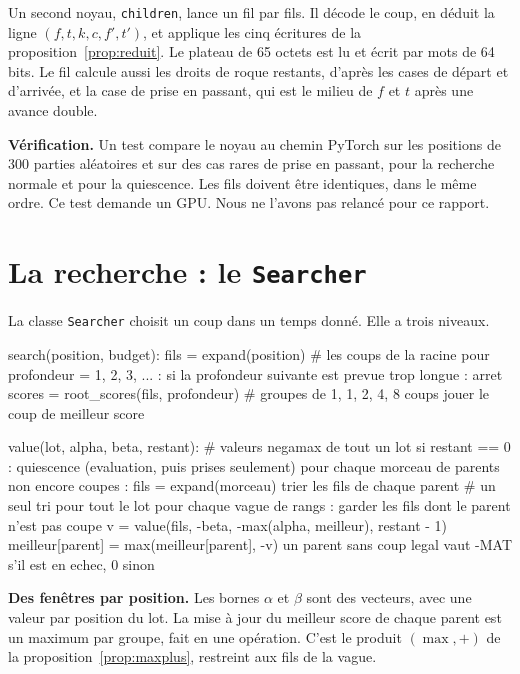 \documentclass[11pt,a4paper]{article}
\newcommand{\code}[1]{\texttt{#1}}
\newcounter{calcul}
\theoremstyle{plain}
\begin{document}
Un second noyau, \code{children}, lance un fil par fils. Il décode le coup, en déduit la ligne
$(f, t, k, c, f', t')$, et applique les cinq écritures de la proposition~\ref{prop:reduit}. Le
plateau de 65 octets est lu et écrit par mots de 64 bits. Le fil calcule aussi les droits de
roque restants, d'après les cases de départ et d'arrivée, et la case de prise en passant, qui est
le milieu de $f$ et $t$ après une avance double.

\textbf{Vérification.} Un test compare le noyau au chemin PyTorch sur les positions de 300
parties aléatoires et sur des cas rares de prise en passant, pour la recherche normale et pour la
quiescence. Les fils doivent être identiques, dans le même ordre. Ce test demande un GPU. Nous ne
l'avons pas relancé pour ce rapport.

\section{La recherche : le \code{Searcher}}

La classe \code{Searcher} choisit un coup dans un temps donné. Elle a trois niveaux.

\begin{python}
search(position, budget):
    fils = expand(position)                    # les coups de la racine
    pour profondeur = 1, 2, 3, ... :
        si la profondeur suivante est prevue trop longue : arret
        scores = root_scores(fils, profondeur) # groupes de 1, 1, 2, 4, 8 coups
    jouer le coup de meilleur score

value(lot, alpha, beta, restant):              # valeurs negamax de tout un lot
    si restant == 0 : quiescence (evaluation, puis prises seulement)
    pour chaque morceau de parents non encore coupes :
        fils = expand(morceau)
        trier les fils de chaque parent        # un seul tri pour tout le lot
        pour chaque vague de rangs :
            garder les fils dont le parent n'est pas coupe
            v = value(fils, -beta, -max(alpha, meilleur), restant - 1)
            meilleur[parent] = max(meilleur[parent], -v)
    un parent sans coup legal vaut -MAT s'il est en echec, 0 sinon
\end{python}

\textbf{Des fenêtres par position.} Les bornes $\alpha$ et $\beta$ sont des vecteurs, avec une
valeur par position du lot. La mise à jour du meilleur score de chaque parent est un maximum par
groupe, fait en une opération. C'est le produit $(\max, +)$ de la
proposition~\ref{prop:maxplus}, restreint aux fils de la vague.
\end{document}
